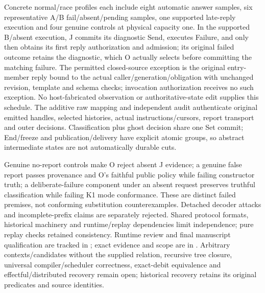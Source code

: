 \documentclass[11pt,a4paper]{article}
\theoremstyle{definition}
\theoremstyle{remark}
\begin{document}
Concrete normal/race profiles each include eight automatic answer samples, six representative A/B fail/absent/pending samples, one supported late-reply execution and four genuine controls at physical capacity one. In the supported B/absent execution, J commits its diagnostic Send, executes Failure, and only then obtains its first reply authorization and admission; its original failed outcome retains the diagnostic, which O actually selects before committing the matching failure. The permitted closed-source exception is the original entry-member reply bound to the actual caller/generation/obligation with unchanged revision, template and schema checks; invocation authorization receives no such exception. No host-fabricated observation or authoritative-state edit supplies this schedule. The additive raw mapping and independent audit authenticate original emitted handles, selected histories, actual instructions/cursors, report transport and outer decisions. Classification plus ghost decision share one Set commit; End/freeze and publication/delivery have explicit atomic groups, so abstract intermediate states are not automatically durable cuts.

Genuine no-report controls make O reject absent J evidence; a genuine false report passes provenance and O's faithful public policy while failing constructor truth; a deliberate-failure component under an absent request preserves truthful classification while failing K1 mode conformance. These are distinct failed premises, not conforming substitution counterexamples. Detached decoder attacks and incomplete-prefix claims are separately rejected. Shared protocol formats, historical machinery and runtime/replay dependencies limit independence; pure replay checks retained consistency. Runtime review and final manuscript qualification are tracked in ; exact evidence and scope are in . Arbitrary contexts/candidates without the supplied relation, recursive tree closure, universal compiler/scheduler correctness, exact-debit equivalence and effectful/distributed recovery remain open; historical recovery retains its original predicates and source identities.
\end{document}
